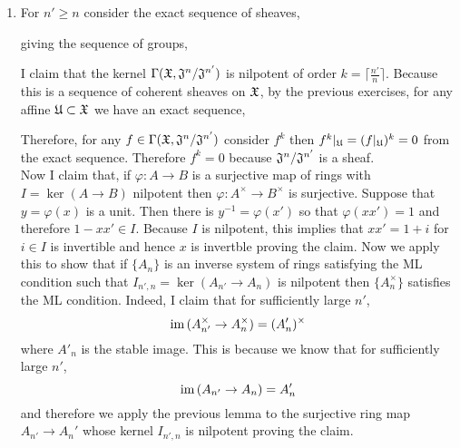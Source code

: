 \documentclass[12pt]{article}
\begin{document}
\begin{enumerate}
\item For $n' \ge n$ consider the exact sequence of sheaves,
\begin{center}
\end{center}
giving the sequence of groups,
\begin{center}
\end{center}
I claim that the kernel $\Gamma(\mathfrak{X}, \mathfrak{J}^n / \mathfrak{J}^{n'})$ is nilpotent of order $k = \lceil \frac{n'}{n} \rceil$. Because this is a sequence of coherent sheaves on $\mathfrak{X}$, by the previous exercises, for any affine $\mathfrak{U} \subset \mathfrak{X}$ we have an exact sequence,
\begin{center}
\end{center}
Therefore, for any $f \in \Gamma(\mathfrak{X}, \mathfrak{J}^n / \mathfrak{J}^{n'})$ consider $f^k$ then $f^k |_{\mathfrak{U}} = (f|_{\mathfrak{U}})^k = 0$ from the exact sequence. Therefore $f^k = 0$ because $\mathfrak{J}^{n} / \mathfrak{J}^{n'}$ is a sheaf. 
\bigskip\\
Now I claim that, if $\varphi : A \to B$ is a surjective map of rings with $I = \ker{(A \to B)}$ nilpotent then $\varphi : A^\times \to B^\times$ is surjective. Suppose that $y = \varphi(x)$ is a unit. Then there is $y^{-1} = \varphi(x')$ so that $\varphi(x x') = 1$ and therefore $1 - x x' \in I$. Because $I$ is nilpotent, this implies that $xx' = 1 + i$ for $i \in I$ is invertible and hence $x$ is invertble proving the claim. Now we apply this to show that if $\{ A_n \}$ is an inverse system of rings satisfying the ML condition such that $I_{n',n} = \ker{(A_{n'} \to A_n)}$ is nilpotent then $\{ A_n^\times \}$ satisfies the ML condition. Indeed, I claim that for sufficiently large $n'$,
\[ \operatorname{\mathrm{im}}{(A^\times_{n'} \to A_n^\times)} = (A'_{n})^\times \]
where $A'_n$ is the stable image. This is because we know that for sufficiently large $n'$,
\[ \operatorname{\mathrm{im}}{(A_{n'} \to A_n)} = A'_n \]
and therefore we apply the previous lemma to the surjective ring map $A_{n'} \to A_n'$ whose kernel $I_{n',n}$ is nilpotent proving the claim. 



\end{enumerate}
\end{document}
